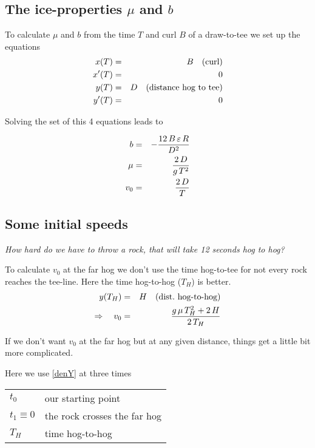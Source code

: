 \subsection{The ice-properties $ \mu $ and $ b $}
To calculate $ \mu $ and $ b $ from the time $ T $ and curl $ B $ of a draw-to-tee
we set up the equations
\begin{eqnarray}
\eqlab{dennyXTee}
x(T) &=& B \quad \mbox{(curl)} \\
x'(T) &=& 0 \\
\eqlab{dennyYTee}
y(T) &=& D \quad \mbox{(distance hog to tee)} \\
\eqlab{dennyYdtTee}
y'(T) &=& 0 
\end{eqnarray}

\noindent Solving the set of this 4 equations leads to 

\begin{eqnarray}
b	&=&	-{{12\,B\,\varepsilon\,R}\over{D^2}} \\
\mu &=&	{{2\,D}\over{g\,T^2}} \\
v_{0} &=&	{{2\,D}\over{T}}
\end{eqnarray}

\subsection{Some initial speeds}

\textit{How hard do we have to throw a rock, that will take 12 seconds hog to
hog?}

To calculate $v_0$ at the far hog we don't use the time hog-to-tee for not
every rock reaches the tee-line. Here the time hog-to-hog ($T_H$) is better.
\begin{eqnarray}
y(T_H) &=& H \quad \mbox{(dist.~hog-to-hog)} \\
\Rightarrow \quad v_0 &=& {{g\,\mu\,T_H^2+2\,H}\over{2\,T_H}}
\end{eqnarray}

If we don't want $v_0$ at the far hog but at any given distance, things get a
little bit more complicated.

Here we use \eqref{denY} at three times

\medskip
\begin{tabular}{l@{ : }l}
$t_0          $ & our starting point \\
$t_1 \equiv 0 $ & the rock crosses the far hog \\
$T_H $          & time hog-to-hog
\end{tabular}
\medskip

